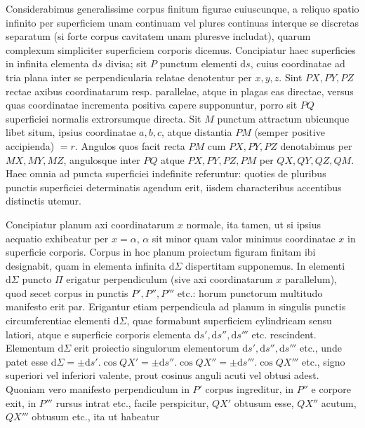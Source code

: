 \par
Considerabimus generalissime corpus finitum figurae cuiuscunque, a reliquo spatio infinito per superficiem unam continuam vel plures continuas interque se discretas separatum (si forte corpus cavitatem unam pluresve includat), quarum complexum simpliciter superficiem corporis dicemus. Concipiatur haec superficies in infinita elementa $\mathrm{d}s$ divisa; sit $P$ punctum elementi $\mathrm{d}s$, cuius coordinatae ad tria plana inter se perpendicularia relatae denotentur per $x,y,z$. Sint $PX,PY,PZ$ rectae axibus coordinatarum resp. parallelae, atque in plagas eas directae, versus quas coordinatae incrementa positiva capere supponuntur, porro sit $PQ$ superficiei normalis extrorsumque directa. Sit $M$ punctum attractum ubicunque libet situm, ipsius coordinatae $a,b,c$, atque distantia $PM$ (semper positive accipienda) $=r$. Angulos quos facit recta $PM$ cum $PX,PY,PZ$ denotabimus per $MX,MY,MZ$, angulosque inter $PQ$ atque $PX,PY,PZ,PM$ per $QX,QY,QZ,QM$. Haec omnia ad puncta superficiei indefinite referuntur: quoties de pluribus punctis superficiei determinatis agendum erit, iisdem characteribus accentibus distinctis utemur.

\par
Concipiatur planum axi coordinatarum $x$ normale, ita tamen, ut si ipsius aequatio exhibeatur per $x=\alpha$, $\alpha$ sit minor quam valor minimus coordinatae $x$ in superficie corporis. Corpus in hoc planum proiectum figuram finitam ibi designabit, quam in elementa infinita $\mathrm{d}\Sigma$ dispertitam supponemus. In elementi $\mathrm{d}\Sigma$ puncto $\Pi$ erigatur perpendiculum (sive axi coordinatarum $x$ parallelum), quod secet corpus in punctis $P',P'',P'''$ etc.: horum punctorum multitudo manifesto erit par. Erigantur etiam perpendicula ad planum in singulis punctis circumferentiae elementi $\mathrm{d}\Sigma$, quae formabunt superficiem cylindricam sensu latiori, atque e superficie corporis elementa $\mathrm{d}s',\mathrm{d}s'',\mathrm{d}s'''$ etc. rescindent. Elementum $\mathrm{d}\Sigma$ erit proiectio singulorum elementorum $\mathrm{d}s',\mathrm{d}s'',\mathrm{d}s'''$ etc., unde patet esse $\mathrm{d}\Sigma=\pm\mathrm{d}s'.\cos QX'=\pm\mathrm{d}s''.\cos QX''=\pm\mathrm{d}s'''.\cos QX'''$ etc., signo superiori vel inferiori valente, prout cosinus anguli acuti vel obtusi adest. Quoniam vero manifesto perpendiculum in $P'$ corpus ingreditur, in $P''$ e corpore exit, in $P'''$ rursus intrat etc., facile perspicitur, $QX'$ obtusum esse, $QX''$ acutum, $QX'''$ obtusum etc., ita ut habeatur
